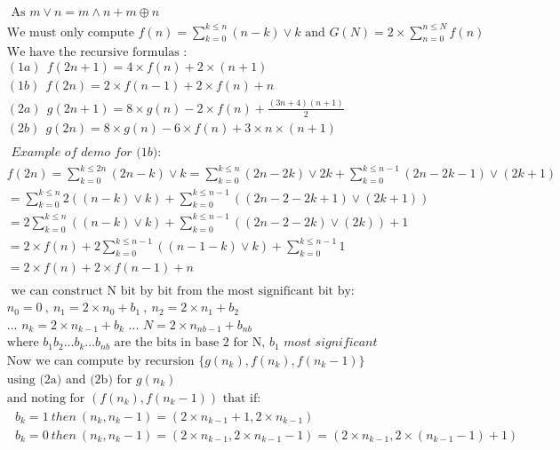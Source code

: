 \documentclass[10pt,a4paper]{letter}
\begin{document}
\begin{align*}
	&\text{ As }m\vee n = m\wedge n + m\oplus n\\
	&\text{We must only compute }f(n)=\sum_{k=0}^{k\leq n}(n-k)\vee k 
	\text{ and } G(N)=2\times \sum_{n=0}^{n\leq N}f(n)\\
	&\text {We have the recursive formulas : }\\
	&(1a)\ \ f(2n+1)=4\times  f(n) + 2\times (n+1)\\
	&(1b)\ \ f(2n)=2 \times f(n-1)+2 \times f(n)+n  \\
	&(2a)\ \ g(2n+1)=8\times g(n)-2\times f(n)+\frac{(3n+4)(n+1)}{2}\\
	&(2b)\ \ g(2n)=8\times g(n)-6\times f(n)+3\times n\times(n+1)\\
\end{align*}
\begin{align*}
	&\textit{ Example of demo for (1b):}\\
	&f(2n)=\sum_{k=0}^{k\leq 2n}(2n-k)\vee k=\sum_{k=0}^{k\leq n}(2n-2k)\vee 2k+\sum_{k=0}^{k\leq n-1}(2n-2k-1)\vee (2k+1)\\
	&=\sum_{k=0}^{k\leq n}2((n-k)\vee k)+\sum_{k=0}^{k\leq n-1}((2n-2-2k+1)\vee (2k+1))\\
	&=2\sum_{k=0}^{k\leq n}((n-k)\vee k)+\sum_{k=0}^{k\leq n-1}((2n-2-2k)\vee (2k))+1\\
	&=2\times f(n)+2\sum_{k=0}^{k\leq n-1}((n-1-k)\vee k)+\sum_{k=0}^{k\leq n-1}1\\
	&=2\times f(n)+2\times f(n-1)+n\\
\end{align*}
\begin{align*}
	&\text{ we can construct N bit by bit from the most significant bit by:}\\
	& n_0=0\ ,\ n_1=2 \times n_0+ b_1\ ,\ n_2=2\times n_1+b_2\\
	&\text{... } n_k=2\times n_{k-1}+b_k\text{ ... }N=2\times n_{nb-1}+b_{nb}\\
	&\text{where } b_1 b_2...b_k...b_{nb} \text{ are the bits in base 2 for N, }b_1\textit   { most significant}\\
	&\text{Now we can compute by recursion } \{g(n_k),f(n_k),f(n_k-1)\}\\
	&\text{using (2a) and (2b) for }g(n_k)\\
	&\text{and noting for }(f(n_k),f(n_k-1))\text{ that if:}\\
	&\ \ \ b_k=1\ then \ (n_k,n_k-1)=(2\times n_{k-1}+1,2\times n_{k-1})\\
	&\ \ \ b_k=0\ then \ (n_k,n_k-1)=(2\times n_{k-1},2\times n_{k-1}-1)=(2\times n_{k-1},2\times (n_{k-1}-1)+1)\\	
\end{align*}	
\end{document}
